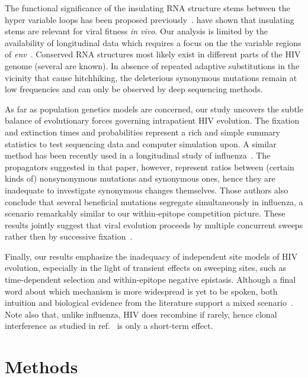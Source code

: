 \documentclass[rmp, twocolumn]{revtex4}
\newcommand{\env}{\textit{env}}
\begin{document}
The functional significance of the insulating RNA structure stems between the
hyper variable loops has been proposed
previously~\citep{watts_architecture_2009, sanjuan_interplay_2011}.
\citet{sanjuan_interplay_2011} have shown that insulating stems are relevant for
viral fitness {\it in vivo}. Our analysis is limited by the availability of
longitudinal data which requires a focus on the the variable regions of \env~.
Conserved RNA structures most likely exist in different parts
of the HIV genome (several are known). In absence of repeated adaptive substitutions in the vicinity
that cause hitchhiking, the deleterious synonymous mutations remain at low
frequencies and can only be observed by deep sequencing methods. 

As far as population genetics models are concerned, our study uncovers the
subtle balance of evolutionary forces governing intrapatient HIV evolution. The
fixation and extinction times and probabilities represent a rich and simple
summary statistics to test sequencing data and computer simulation upon. A
similar method has been recently used in a longitudinal study of
influenza~\citep{strelkowa_clonal_2012}. The propagators suggested in that
paper, however, represent ratios between (certain kinds of) nonsynonymous
mutations and synonymous ones, hence they are inadequate to investigate
synonymous changes themselves. Those authors also conclude that several
beneficial mutations segregate simultaneously in influenza, a scenario
remarkably similar to our within-epitope competition picture. These results
jointly suggest that viral evolution proceeds by multiple concurrent sweeps
rather then by successive fixation~\citep{desai_beneficial_2007, neher_rate_2010}.

Finally, our results emphasize the inadequacy of independent site
models of HIV evolution, especially in the light of transient effects on
sweeping sites, such as time-dependent selection and within-epitope negative
epistasis. Although a final word about which mechanism is more
widespread is yet to be spoken, both intuition and biological evidence from the
literature support a mixed scenario~\citep{richman_rapid_2003,
moore_limited_2009, bar_early_2012}. Note also that, unlike influenza, HIV does
recombine if rarely, hence clonal interference as studied in
ref.~\citep{strelkowa_clonal_2012} is only a short-term effect.

\section{Methods}
\end{document}
